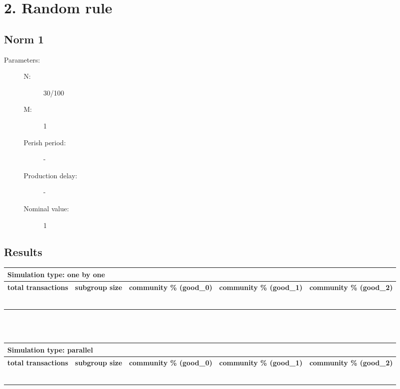 \documentclass{article}
\begin{document}
\section{2. Random rule}

\subsection{Norm 1}
\begin{description}
  \item[Parameters:] \hfill
	\begin{description}
  		\item[N:] 30/100
		\item[M:] 1
		\item[Perish period:] -
		\item[Production delay:] -
		\item[Nominal value:] 1
	\end{description}

\end{description}

\subsection{Results}
\begin{tabular}{|  l | c | p{2.5cm} | p{2.5cm} | p{2.5cm} | }
     \multicolumn{5}{l}{\textbf{Simulation type: one by one}} \\ \hline
     \textbf{total transactions} & \textbf{subgroup size} & \textbf{community \% (good\_0)} & \textbf{community \% (good\_1)}  & \textbf{community \% (good\_2)} \\ \hline
     &  & & &  \\ \hline
     &  & & & \\ \hline
     &  & & & \\ \hline
     &  & & &  \\ \hline
     &  & & &  \\ \hline
     &  & & & \\ \hline
\end{tabular}
\\
\\
\begin{tabular}{|  l | c | p{2.5cm} | p{2.5cm} | p{2.5cm} | }
     \multicolumn{5}{l}{\textbf{Simulation type: parallel}} \\ \hline
     \textbf{total transactions} & \textbf{subgroup size} & \textbf{community \% (good\_0)} & \textbf{community \% (good\_1)}  & \textbf{community \% (good\_2)} \\ \hline
     &  & & &  \\ \hline
     &  & & & \\ \hline
     &  & & & \\ \hline
     &  & & &  \\ \hline
     &  & & &  \\ \hline
     &  & & & \\ \hline
\end{tabular}
\end{document}
